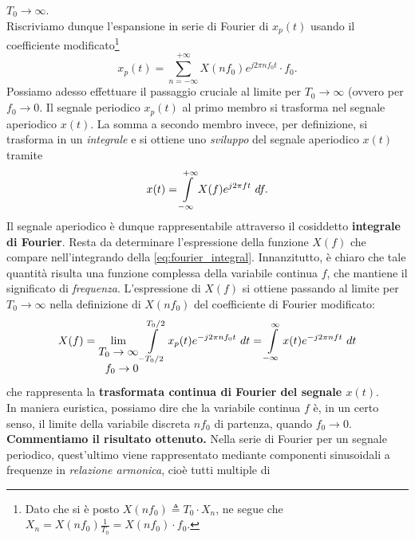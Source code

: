 \documentclass[12pt,oneside,openany]{memoir}
\numberwithin{equation}{subsection}
\newcommand{\dt}{\ dt}
\newcommand{\df}{\ df}
\begin{document}
$T_0 \rightarrow \infty$.\\
Riscriviamo dunque l'espansione in serie di Fourier di $x_p(t)$ usando il
coefficiente modificato\footnote{Dato che si \`e posto
$X(nf_0) \triangleq T_0 \cdot X_n$, ne segue che
$X_n = X(n f_0) \frac{1}{T_0} = X(n f_0) \cdot f_0$.}
\begin{equation}
	x_p(t) = \sum_{n = -\infty}^{+\infty} X(n f_0) e^{j 2 \pi n f_0 t}
	\cdot f_0.
\end{equation}
Possiamo adesso effettuare il passaggio cruciale al limite per
$T_0 \rightarrow \infty$ (ovvero per $f_0 \rightarrow 0$. Il segnale periodico
$x_p(t)$ al primo membro si trasforma nel segnale aperiodico $x(t)$. La somma a
secondo membro invece, per definizione, si trasforma in un \textit{integrale} e
si ottiene uno \textit{sviluppo} del segnale aperiodico $x(t)$ tramite
\begin{equation}\label{eq:fourier_integral}
	x(t) = \int\displaylimits_{-\infty}^{+\infty} X(f) e^{j 2 \pi f t} \df.
\end{equation}
Il segnale aperiodico \`e dunque rappresentabile attraverso il cosiddetto
\textbf{integrale di Fourier}. Resta da determinare l'espressione della funzione
$X(f)$ che compare nell'integrando della \eqref{eq:fourier_integral}.
Innanzitutto, \`e chiaro che tale quantit\`a risulta una funzione complessa
della variabile continua $f$, che mantiene il significato di \textit{frequenza}.
L'espressione di $X(f)$ si ottiene passando al limite per
$T_0 \rightarrow \infty$ nella definizione di $X(nf_0)$ del coefficiente di
Fourier modificato:
\begin{equation}\label{eq:tcf_coefficient}
	X(f) = \lim_{\begin{split}T_0 \rightarrow \infty \\ f_0 \rightarrow 0\end{split}}
		\int\displaylimits_{-T_0/2}^{T_0/2} x_p(t) e^{-j 2 \pi n f_0 t}
		\dt = \int\displaylimits_{-\infty}^{\infty} x(t)
		e^{-j 2 \pi n f t} \dt 
\end{equation}
che rappresenta la \textbf{trasformata continua di Fourier del segnale
$x(t)$}.\\
In maniera euristica, possiamo dire che la variabile continua $f$ \`e, in un
certo senso, il limite della variabile discreta $n f_0$ di partenza, quando
$f_0 \rightarrow 0$.
\bigbreak
\textbf{Commentiamo il risultato ottenuto.} Nella serie di Fourier per un
segnale periodico, quest'ultimo viene rappresentato mediante componenti
sinusoidali a frequenze in \textit{relazione armonica}, cio\`e tutti multiple di
\end{document}

